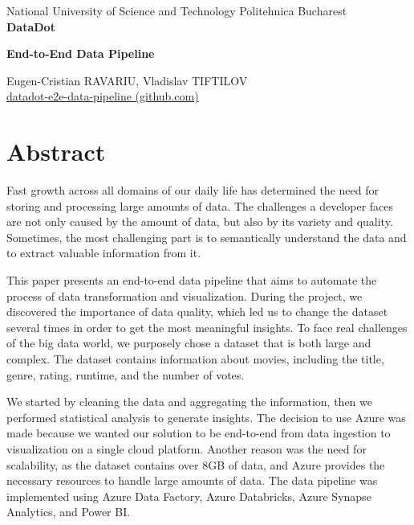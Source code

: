 \documentclass[a4paper,12pt]{article}
\author{Eugen-Cristian RAVARIU, Vladislav TIFTILOV}
\begin{document}
\begin{titlepage}
    \centering
    National University of Science and Technology Politehnica Bucharest\\
    \vfill
    {\bfseries\fontsize{14pt}{14pt} DataDot}\par
    \vspace{0.5cm}
    {\bfseries\fontsize{12pt}{12pt} End-to-End Data Pipeline}\par
    \vspace{2.5cm}
    Eugen-Cristian RAVARIU, Vladislav TIFTILOV\\
    \href{https://github.com/vladtf/datadot-e2e-data-pipeline}{datadot-e2e-data-pipeline (github.com)}\par
    \vfill
    \date{\today}
\end{titlepage}

\section{Abstract}
\label{sec:abstract}

Fast growth across all domains of our daily life has determined the need for storing and processing 
large amounts of data. The challenges a developer faces are not only caused by the amount of data, 
but also by its variety and quality. Sometimes, the most challenging part is to semantically understand 
the data and to extract valuable information from it.

This paper presents an end-to-end data pipeline that aims to automate the process of data transformation 
and visualization. During the project, we discovered the importance of data quality, which led us to change 
the dataset several times in order to get the most meaningful insights. To face real challenges of the 
big data world, we purposely chose a dataset that is both large and complex. The dataset contains 
information about movies, including the title, genre, rating, runtime, and the number of votes.

We started by cleaning the data and aggregating the information, then we performed statistical 
analysis to generate insights. The decision to use Azure was made because we wanted our solution 
to be end-to-end from data ingestion to visualization on a single cloud platform. Another reason 
was the need for scalability, as the dataset contains over 8GB of data, and Azure provides the 
necessary resources to handle large amounts of data. The data pipeline was implemented using 
Azure Data Factory, Azure Databricks, Azure Synapse Analytics, and Power BI.
\end{document}
